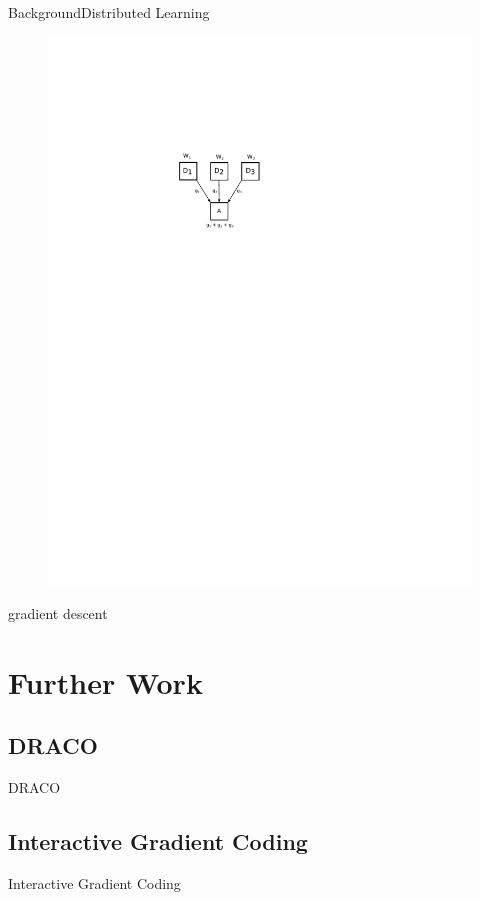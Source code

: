\documentclass{beamer}
\begin{document}
\begin{frame}{Background}{Distributed Learning}

\begin{figure}
    \centering
    \includegraphics{res/distributed_learning.pdf}
\end{figure}

gradient descent

\end{frame}

\section{Further Work}

\subsection{DRACO}

\begin{frame}{DRACO}

\end{frame}

\subsection{Interactive Gradient Coding}

\begin{frame}{Interactive Gradient Coding}

\end{frame}
\end{document}
